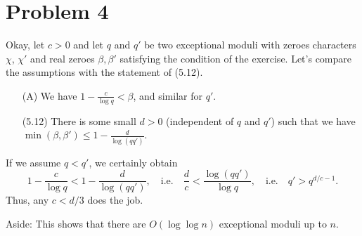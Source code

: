 \documentclass[a4paper,11pt]{article}
\begin{document}
\section*{Problem 4}
Okay, let $c>0$ and let $q$ and $q'$ be two exceptional moduli with zeroes characters
$\chi$, $\chi'$ and real zeroes $\beta, \beta'$ satisfying the condition of the
exercise. Let's compare the assumptions with the statement of (5.12).
\begin{enumerate}
    \item[(A)] We have $1 - \frac c{\log q} < \beta$, and similar for $q'$.
    \item[(5.12)] There is some small $d>0$ (independent of $q$ and $q'$) such
        that we have $\min(\beta, \beta') \leq 1 - \frac d{\log(qq')}$. 
\end{enumerate}
If we assume $q < q'$, we certainly obtain
\[
    1 - \frac c {\log q} < 1 - \frac d {\log(qq')}, \quad \text{i.e.}
    \quad \frac dc < \frac  {\log(qq')}{\log q}, \quad \text{i.e.} \quad
    q' > q^{d/c - 1}.
\]
Thus, any $c < d/3$ does the job. 

Aside: This shows that there are $O(\log \log n)$ exceptional moduli up to $n$. 


\contactend
\end{document}
